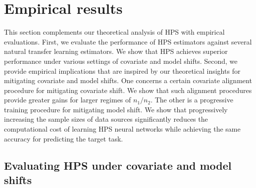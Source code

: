 \section{Empirical results}

This section complements our theoretical analysis of HPS with empirical evaluations.
First, we evaluate the performance of HPS estimators against several natural transfer learning estimators.
We show that HPS achieves superior performance under various settings of covariate and model shifts.
Second, we provide empirical implications that are inspired by our theoretical insights for mitigating covariate and model shifts.
One concerns a certain covariate alignment procedure for mitigating covariate shift.
We show that such alignment procedures provide greater gains for larger regimes of $n_1 / n_2$.
The other is a progressive training procedure for mitigating model shift.
We show that progressively increasing the sample sizes of data sources significantly reduces the computational cost of learning HPS neural networks while achieving the same accuracy for predicting the target task.

\subsection{Evaluating HPS under covariate and model shifts}\label{sec_diff}

